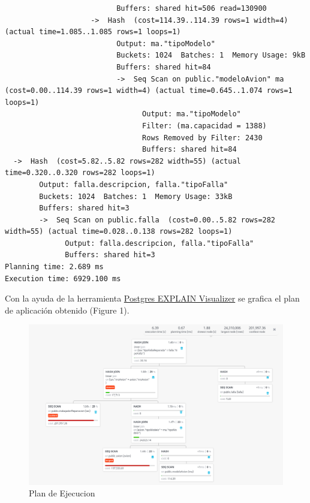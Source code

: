 \documentclass[12pt]{report}
\begin{document}
\begin{lstlisting}
                          Buffers: shared hit=506 read=130900
                    ->  Hash  (cost=114.39..114.39 rows=1 width=4) (actual time=1.085..1.085 rows=1 loops=1)
                          Output: ma."tipoModelo"
                          Buckets: 1024  Batches: 1  Memory Usage: 9kB
                          Buffers: shared hit=84
                          ->  Seq Scan on public."modeloAvion" ma  (cost=0.00..114.39 rows=1 width=4) (actual time=0.645..1.074 rows=1 loops=1)
                                Output: ma."tipoModelo"
                                Filter: (ma.capacidad = 1388)
                                Rows Removed by Filter: 2430
                                Buffers: shared hit=84
  ->  Hash  (cost=5.82..5.82 rows=282 width=55) (actual time=0.320..0.320 rows=282 loops=1)
        Output: falla.descripcion, falla."tipoFalla"
        Buckets: 1024  Batches: 1  Memory Usage: 33kB
        Buffers: shared hit=3
        ->  Seq Scan on public.falla  (cost=0.00..5.82 rows=282 width=55) (actual time=0.028..0.138 rows=282 loops=1)
              Output: falla.descripcion, falla."tipoFalla"
              Buffers: shared hit=3
Planning time: 2.689 ms
Execution time: 6929.100 ms
\end{lstlisting}

Con la ayuda de la herramienta \href{http://tatiyants.com/pev/}{Postgres EXPLAIN Visualizer} se grafica el plan de aplicación obtenido (Figure 1).

\begin{figure}[!ht]
    \centering
    \includegraphics[width=1\textwidth]{images/plan_ejecucion_pre_index.png}
    \caption{Plan de Ejecucion}
    \centering
    \label{label:file_name}
\end{figure}
\end{document}
